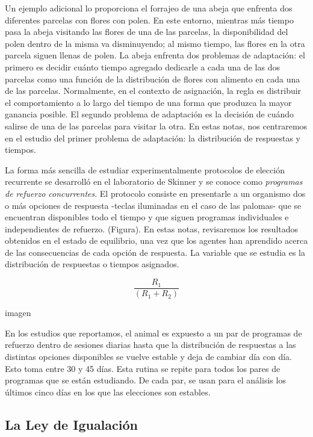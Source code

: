 \documentclass[
  letterpaper,
]{book}
\begin{document}
Un ejemplo adicional lo proporciona el forrajeo de una abeja que
enfrenta dos diferentes parcelas con flores con polen. En este entorno,
mientras más tiempo pasa la abeja visitando las flores de una de las
parcelas, la disponibilidad del polen dentro de la misma va
disminuyendo; al mismo tiempo, las flores en la otra parcela siguen
llenas de polen. La abeja enfrenta dos problemas de adaptación: el
primero es decidir cuánto tiempo agregado dedicarle a cada una de las
dos parcelas como una función de la distribución de flores con alimento
en cada una de las parcelas. Normalmente, en el contexto de asignación,
la regla es distribuir el comportamiento a lo largo del tiempo de una
forma que produzca la mayor ganancia posible. El segundo problema de
adaptación es la decisión de cuándo salirse de una de las parcelas para
visitar la otra. En estas notas, nos centraremos en el estudio del
primer problema de adaptación: la distribución de respuestas y tiempos.

La forma más sencilla de estudiar experimentalmente protocolos de
elección recurrente se desarrolló en el laboratorio de Skinner y se
conoce como \emph{programas de refuerzo concurrentes}. El protocolo
consiste en presentarle a un organismo dos o más opciones de respuesta
-teclas iluminadas en el caso de las palomas- que se encuentran
disponibles todo el tiempo y que siguen programas individuales e
independientes de refuerzo. (Figura). En estas notas, revisaremos los
resultados obtenidos en el estado de equilibrio, una vez que los agentes
han aprendido acerca de las consecuencias de cada opción de respuesta.
La variable que se estudia es la distribución de respuestas o tiempos
asignados.

\[
\frac{R_1} {(R_1 +R_2)}
\]

imagen

En los estudios que reportamos, el animal es expuesto a un par de
programas de refuerzo dentro de sesiones diarias hasta que la
distribución de respuestas a las distintas opciones disponibles se
vuelve estable y deja de cambiar día con día. Esto toma entre 30 y 45
días. Esta rutina se repite para todos los pares de programas que se
están estudiando. De cada par, se usan para el análisis los últimos
cinco días en los que las elecciones son estables.

\subsection{La Ley de Igualación}\label{la-ley-de-igualaciuxf3n}
\end{document}
